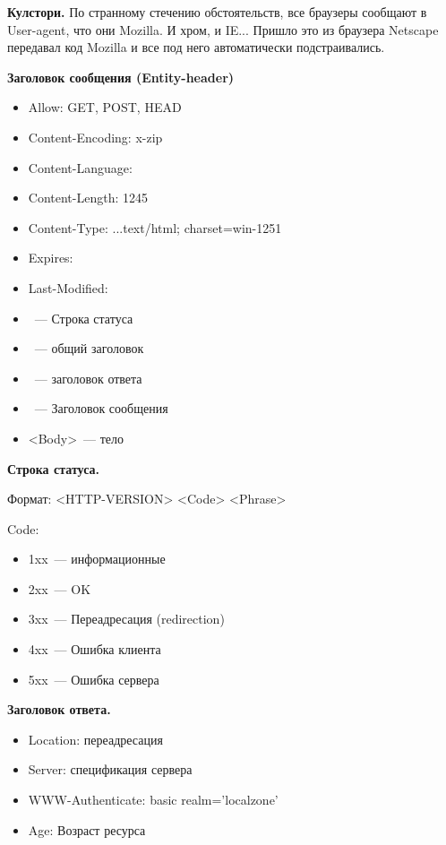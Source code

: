 {\bf Кулстори.} По странному стечению обстоятельств, все браузеры сообщают в User-agent, что они Mozilla. И хром, и IE... Пришло это из браузера Netscape передавал код Mozilla и все под него автоматически подстраивались.

{\bf Заголовок сообщения (Entity-header)}

\begin{itemize}
    \item Allow: GET, POST, HEAD
    \item Content-Encoding: x-zip
    \item Content-Language:
    \item Content-Length: 1245
    \item Content-Type: ...text/html; charset=win-1251
    \item Expires:
    \item Last-Modified:
\end{itemize}


\begin{itemize}
    \item <Status-line>~--- Строка статуса
    \item <General-header>~--- общий заголовок
    \item <Response-header>~--- заголовок ответа
    \item <Entity-header>~--- Заголовок сообщения
    \item <Body>~--- тело
\end{itemize}

{\bf Строка статуса.}

Формат: <HTTP-VERSION> <Code> <Phrase>

Code:
\begin{itemize}
    \item 1xx~--- информационные
    \item 2xx~--- OK
    \item 3xx~--- Переадресация (redirection)
    \item 4xx~--- Ошибка клиента
    \item 5xx~--- Ошибка сервера
\end{itemize}

{\bf Заголовок ответа.}
\begin{itemize}
    \item Location: переадресация
    \item Server: спецификация сервера
    \item WWW-Authenticate: basic realm=’localzone’
    \item Age: Возраст ресурса
\end{itemize}

